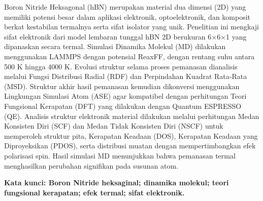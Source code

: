 {\singlespacing\indent%
Boron Nitride Heksagonal (hBN) merupakan material dua dimensi (2D) yang memiliki potensi besar dalam aplikasi elektronik, optoelektronik, dan komposit berkat kestabilan termalnya serta sifat isolator yang unik. Penelitian ini mengkaji sifat elektronik dari model lembaran tunggal hBN 2D berukuran 6$\times$6$\times$1 yang dipanaskan secara termal. Simulasi Dinamika Molekul (MD) dilakukan menggunakan LAMMPS dengan potensial ReaxFF, dengan rentang suhu antara 500 K hingga 4000 K. Evolusi struktur selama proses pemanasan dianalisis melalui Fungsi Distribusi Radial (RDF) dan Perpindahan Kuadrat Rata-Rata (MSD). Struktur akhir hasil pemanasan kemudian dikonversi menggunakan Lingkungan Simulasi Atom (ASE) agar kompatibel dengan perhitungan Teori Fungsional Kerapatan (DFT) yang dilakukan dengan Quantum ESPRESSO (QE). Analisis struktur elektronik material dilakukan melalui perhitungan Medan Konsisten Diri (SCF) dan Medan Tidak Konsisten Diri (NSCF) untuk memperoleh struktur pita, Kerapatan Keadaan (DOS), Kerapatan Keadaan yang Diproyeksikan (PDOS), serta distribusi muatan dengan mempertimbangkan efek polarisasi spin. Hasil simulasi MD menunjukkan bahwa pemanasan termal menghasilkan perubahan signifikan pada susunan atom.
}


\vspace{5mm}

\noindent \textbf{Kata kunci: Boron Nitride heksaginal; dinamika molekul; teori fungsional kerapatan; efek termal; sifat elektronik.} \textit{} %

\newpage


